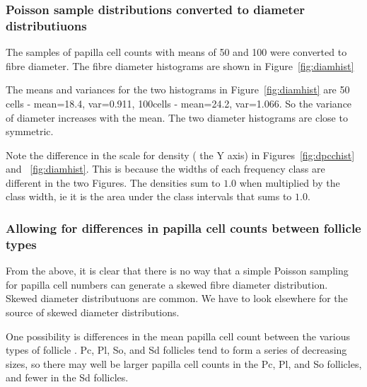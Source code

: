 \documentclass[titlepage]{article}  %
\begin{document}
\subsubsection{Poisson sample distributions converted to diameter distributiuons}
The samples of papilla cell counts with means of 50 and 100 were converted to fibre diameter. The fibre diameter histograms are shown in Figure~\ref{fig:diamhist}

The means and variances for the two histograms in Figure~\ref{fig:diamhist} are
50 cells - mean=18.4, var=0.911, 100cells - mean=24.2, var=1.066. So the variance of diameter increases with the mean. The two diameter histograms are close to symmetric. 

Note the difference in the scale for density ( the Y axis) in Figures~\ref{fig:dpcchist} and ~\ref{fig:diamhist}. This is because the widths of each frequency class are different in the two Figures. The densities sum to $1.0$ when multiplied by the class width, ie it is the area under the class intervals that sums to $1.0$.

\subsubsection{Allowing for differences in papilla cell counts between follicle types}
 From the above, it is clear that there is no way that a simple Poisson sampling for papilla cell numbers can generate a skewed fibre diameter distribution. Skewed diameter distributuons are common. We have to look elsewhere for the source of skewed diameter distributions. 

One possibility is differences in the mean papilla cell count between the various types of follicle . Pc, Pl, So, and Sd follicles tend to form a series of decreasing sizes, so there may well be larger papilla cell counts in the Pc, Pl, and So follicles, and fewer in the Sd follicles. 
\end{document}
